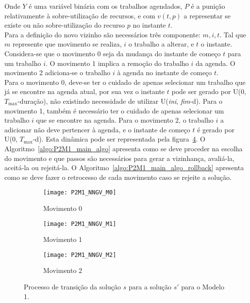 Onde $Y$ é uma variável binária com os trabalhos agendados, $P$ é a punição relativamente à sobre-utilização de recursos, e com $v(t,p)$ a representar se existe ou não sobre-utilização do recurso $p$ no instante $t$.\\

Para a definição do novo vizinho são necessários três componente: $m,i,t$. Tal que $m$ represente que movimento se realiza, $i$ o trabalho a alterar, e $t$ o instante. Considera-se que o movimento 0 seja da mudança do instante de começo $t$ para um trabalho $i$. O movimento 1 implica a remoção do trabalho $i$ da agenda. O movimento 2 adiciona-se o trabalho $i$ à agenda no instante de começo $t$.\\
Para o movimento 0, deve-se ter o cuidado de apenas selecionar um trabalho que já se encontre na agenda atual, por sua vez o instante $t$ pode ser gerado por U(0, $T_{\max}$-duração), não existindo necessidade de utilizar U(\textit{ini}, \textit{fim}-d). Para o movimento 1, também é necessário ter o cuidado de apenas selecionar um trabalho $i$ que se encontre na agenda. Para o movimento 2, o trabalho $i$ a adicionar não deve pertencer à agenda, e o instante de começo $t$ é gerado por U(0, $T_{\max}$-d). Esta dinâmica pode ser representada pela figura~\ref{fig:P2M1_NNGV_gen}. O Algoritmo~\ref{algo:P2M1_main_algo} apresenta como se deve proceder na escolha do movimento e que passos são necessários para gerar a vizinhança, avaliá-la, aceitá-la ou rejeitá-la. O Algoritmo~\ref{algo:P2M1_main_algo_rollback} apresenta como se deve fazer o retrocesso de cada movimento caso se rejeite a solução.\\
\begin{figure}[H]
	\centering
	\begin{subfigure}{0.49\textwidth}
	\centering
		\texttt{[image: P2M1\_NNGV\_M0]}
		\caption{Movimento 0}
		\label{fig:P2M1_NNGV_M0}
	\end{subfigure}
	\begin{subfigure}{0.49\textwidth}
	\centering
		\texttt{[image: P2M1\_NNGV\_M1]}
		\caption{Movimento 1}
		\label{fig:P2M1_NNGV_M1}
	\end{subfigure}
	\begin{subfigure}{0.49\textwidth}
	\centering
		\texttt{[image: P2M1\_NNGV\_M2]}
		\caption{Movimento 2}
		\label{fig:P2M1_NNGV_M2}
	\end{subfigure}
	\caption{Processo de transição da solução $s$ para a solução $s'$ para o Modelo 1.}
	\label{fig:P2M1_NNGV_gen}
\end{figure}

